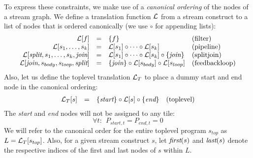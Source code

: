 \documentclass[12pt]{article}
\begin{document}
  To express these constraints, we make use of a {\it canonical
  ordering} of the nodes of a stream graph.  We define a translation
  function ${\cal L}$ from a stream construct to a list of nodes that
  is ordered canonically (we use $\circ$ for appending lists):
  \[
  \begin{array}{rcll}
    {\cal L}[f] 
    & = & \{f\}
    & \mbox{(filter)} \\
    {\cal L}[s_1, \dots, s_k] 
    & = & {\cal L}[s_1] \circ \dots \circ {\cal L}[s_k]
    & \mbox{(pipeline)} \\
    {\cal L}[\mbox{\it split}, s_1, \dots, s_k, \mbox{\it join}] 
    & = & {\cal L}[s_1] \circ \dots \circ {\cal L}[s_k] \circ \{ \mbox{\it join} \}
    & \mbox{(splitjoin)} \\
    {\cal L}[\mbox{\it join}, s_{body}, s_{loop}, \mbox{\it split}]
    & = & \{ \mbox{\it join} \} \circ {\cal L}[s_{body}] \circ {\cal L}[s_{loop}]
    & \mbox{(feedbackloop)}
  \end{array}
  \]
  Also, let us define the toplevel translation ${\cal L}_T$ to place a
  dummy start and end node in the canonical ordering:
  \[
  \begin{array}{rcll}
    {\cal L}_T[s]
    & = & \{ \mbox{\it start} \} \circ {\cal L}[s] \circ \{ \mbox{\it end} \}
    & \mbox{(toplevel)}
  \end{array}
  \]
  The {\it start} and {\it end} nodes will not be assigned to any
  tile:
  \[
  \forall t:~~P_{start,t} = P_{end,t} = 0
  \]
  We will refer to the canonical order for the entire toplevel program
  $s_{top}$ as $L = {\cal L}_T[s_{top}]$.  Also, for a given stream
  construct $s$, let $\mbox{\it first}(s)$ and $\mbox{\it last}(s)$ denote the
  respective indices of the first and last nodes of $s$ within $L$.
\end{document}
